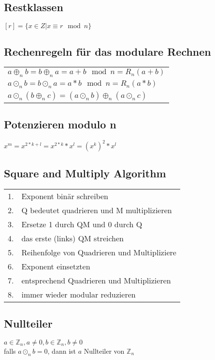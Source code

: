 \subsection{Restklassen}
$ [r] = \{x \in Z | x \equiv r \mod n\} $

\subsection{Rechenregeln für das modulare Rechnen}
\begin{tabular}{l}
    $a \oplus_n b = b \oplus_n a = a + b \mod n = R_n(a + b) $ \\
    $a \odot_n b = b \odot_n a = a * b \mod n = R_n(a * b)$ \\
    $a \odot_n (b \oplus_n c) = (a \odot_n b) \oplus_n (a \odot_n c)$ \\
\end{tabular} \newline

\subsection{Potenzieren modulo n}
$ x^m = x^{2 * k + l} = x^{2 * k} * x^l = (x^k)^2 * x^l $

\subsection{Square and Multiply Algorithm}
\begin{tabular}{rl}
    1. & Exponent binär schreiben \\
    2. & Q bedeutet quadrieren und M multiplizieren \\
    3. & Ersetze 1 durch QM und 0 durch Q \\
    4. & das erste (links) QM streichen \\
    5. & Reihenfolge von Quadrieren und Multipliziere \\
    6. & Exponent einsetzten \\
    7. & entsprechend Quadrieren und Multiplizieren \\
    8. & immer wieder modular reduzieren \\
\end{tabular}

\subsection{Nullteiler}
$ a \in \mathbb{Z}_n, a \neq 0, b \in \mathbb{Z}_n, b \neq 0 $ \\
falls $ a \odot_n b = 0 $, dann ist $a$ Nullteiler von $\mathbb{Z}_n$

